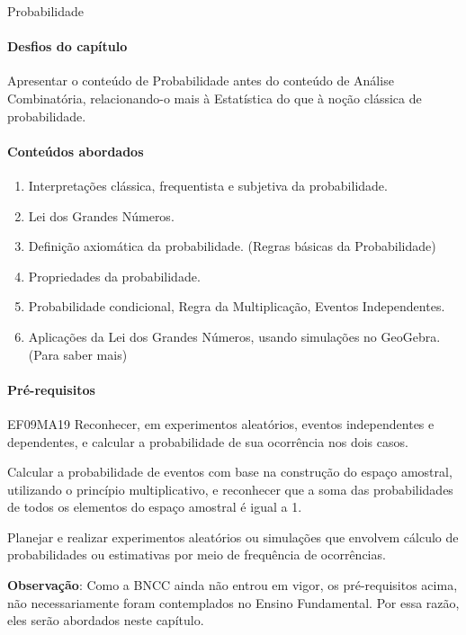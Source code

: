 \begin{apresentacao}{Probabilidade}
\paragraph{Desfios do capítulo}
Apresentar o conteúdo de Probabilidade antes do conteúdo de Análise Combinatória, relacionando-o mais à Estatística do que à noção clássica de probabilidade.

\paragraph{Conteúdos abordados}
\begin{enumerate}
\item Interpretações clássica, frequentista e subjetiva da probabilidade.
\item Lei dos Grandes Números.
\item Definição axiomática da probabilidade. (Regras básicas da Probabilidade)
\item Propriedades da probabilidade.
\item Probabilidade condicional, Regra da Multiplicação, Eventos Independentes.
\item Aplicações da Lei dos Grandes Números, usando simulações no GeoGebra.(Para saber mais)
\end{enumerate}



\paragraph{Pré-requisitos}
\begin{habilities}{EF09MA19}
Reconhecer, em experimentos aleatórios, eventos independentes e dependentes, e calcular a probabilidade de sua ocorrência nos dois casos.

Calcular a probabilidade de eventos com base na construção do espaço amostral, utilizando o princípio multiplicativo, e reconhecer que a soma das probabilidades de todos os elementos do espaço amostral é igual a 1.

Planejar e realizar experimentos aleatórios ou simulações que envolvem cálculo de probabilidades ou estimativas por meio de frequência de ocorrências.
\end{habilities}

\textbf{Observação}: Como a BNCC ainda não entrou em vigor, os pré-requisitos acima, não necessariamente foram contemplados no Ensino Fundamental. Por essa razão, eles serão abordados neste capítulo.


\end{apresentacao}
